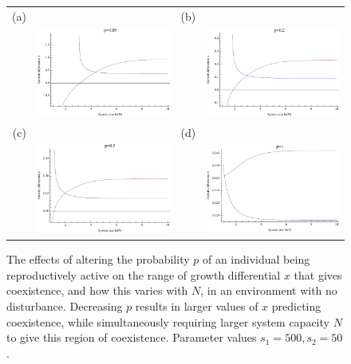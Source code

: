 \begin{figure}[th]
\centering
   \begin{tabular}{rrrr}
   (a)&&(b)&\\
  &\includegraphics[width=2.5in]{p005nondist.pdf} && \includegraphics[width=2.5in]{p020nondist.pdf} \\
  (c)&&(d)&\\
  &\includegraphics[width=2.5in]{p050nondist.pdf} && \includegraphics[width=2.5in]{p100nondist.pdf} \end{tabular}
   \caption[Coexistence without disturbance for reduced productivity]{The effects of altering the probability $p$ of an individual being reproductively active on the range of growth differential $x$ that gives coexistence, and how this varies with $N$, in an environment with no disturbance. Decreasing $p$ results in larger values of $x$ predicting coexistence, while simultaneously requiring larger system capacity $N$ to give this region of coexistence. Parameter values $s_1=500, s_2=50$.}
 \label{fig:pnondist}
\end{figure}


